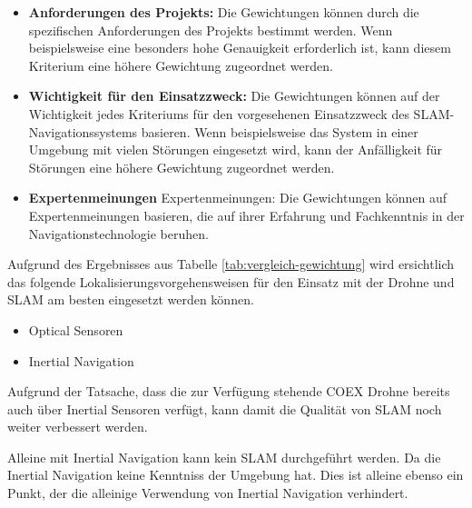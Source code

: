 \begin{itemize}
\item \textbf{Anforderungen des Projekts:} Die Gewichtungen können durch die spezifischen Anforderungen des Projekts bestimmt werden. Wenn beispielsweise eine besonders hohe Genauigkeit erforderlich ist, kann diesem Kriterium eine höhere Gewichtung zugeordnet werden.

\item \textbf{Wichtigkeit für den Einsatzzweck:} Die Gewichtungen können auf der Wichtigkeit jedes Kriteriums für den vorgesehenen Einsatzzweck des SLAM-Navigationssystems basieren. Wenn beispielsweise das System in einer Umgebung mit vielen Störungen eingesetzt wird, kann der Anfälligkeit für Störungen eine höhere Gewichtung zugeordnet werden.
\item \textbf{Expertenmeinungen} Expertenmeinungen: Die Gewichtungen können auf Expertenmeinungen basieren, die auf ihrer Erfahrung und Fachkenntnis in der Navigationstechnologie beruhen.
\end{itemize}

Aufgrund des Ergebnisses aus Tabelle \ref{tab:vergleich-gewichtung} wird ersichtlich das folgende Lokalisierungsvorgehensweisen für den Einsatz mit der Drohne und SLAM am besten eingesetzt werden können.

\begin{itemize}
    \item Optical Sensoren
    \item Inertial Navigation
\end{itemize}

Aufgrund der Tatsache, dass die zur Verfügung stehende COEX Drohne bereits auch über Inertial Sensoren verfügt, kann damit die Qualität von \ac{SLAM} noch weiter verbessert werden.

Alleine mit Inertial Navigation kann kein \ac{SLAM} durchgeführt werden. Da die Inertial Navigation keine Kenntniss der Umgebung hat. Dies ist alleine ebenso ein Punkt, der die alleinige Verwendung von Inertial Navigation verhindert.

